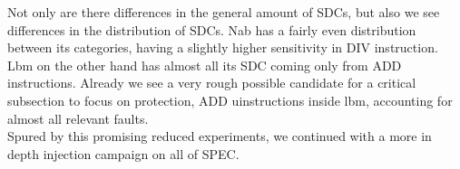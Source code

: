 \documentclass[lettersize,journal]{IEEEtran}
\begin{document}
Not only are there differences in the general amount of SDCs, but also we see differences in the distribution of SDCs. Nab has a fairly even distribution between its categories, having a slightly higher sensitivity in DIV instruction. Lbm on the other hand has almost all its SDC coming only from ADD instructions. Already we see a very rough possible candidate for a critical subsection to focus on protection, ADD uinstructions inside lbm, accounting for almost all relevant faults.\\
Spured by this promising reduced experiments, we continued with a more in depth injection campaign on all of SPEC.


\end{document}
